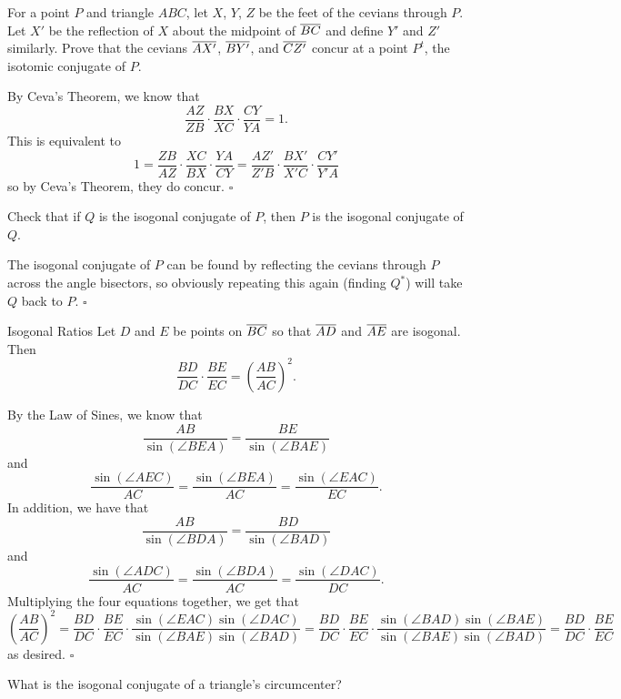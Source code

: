 \documentclass{article}
\begin{document}
\begin{problem}[4.20]{}
For a point $P$ and triangle $ABC$, let $X$, $Y$, $Z$ be the feet of the cevians through $P$. Let $X'$ be the reflection of $X$ about the midpoint of $\overline{BC}$ and define $Y'$ and $Z'$ similarly. Prove that the cevians $\overline{AX'}$, $\overline{BY'}$, and $\overline{CZ'}$ concur at a point $P^t$, the isotomic conjugate of $P$.
\end{problem}

By Ceva's Theorem, we know that \[\dfrac{AZ}{ZB}\cdot\dfrac{BX}{XC}\cdot\dfrac{CY}{YA} = 1.\] This is equivalent to \[1 = \dfrac{ZB}{AZ}\cdot\dfrac{XC}{BX}\cdot\dfrac{YA}{CY} = \dfrac{AZ'}{Z'B}\cdot\dfrac{BX'}{X'C}\cdot\dfrac{CY'}{Y'A}\] so by Ceva's Theorem, they do concur. $\square$

\begin{problem}[4.21]{}
Check that if $Q$ is the isogonal conjugate of $P$, then $P$ is the isogonal conjugate of $Q$.
\end{problem}

The isogonal conjugate of $P$ can be found by reflecting the cevians through $P$ across the angle bisectors, so obviously repeating this again (finding $Q^*$) will take $Q$ back to $P$. $\square$

\begin{problem}[4.22]{Isogonal Ratios}
Let $D$ and $E$ be points on $\overline{BC}$ so that $\overline{AD}$ and $\overline{AE}$ are isogonal. Then \[\dfrac{BD}{DC}\cdot\dfrac{BE}{EC} = \left(\dfrac{AB}{AC}\right)^2.\]
\end{problem}

By the Law of Sines, we know that \[\dfrac{AB}{\sin(\angle BEA)} = \dfrac{BE}{\sin(\angle BAE)}\] and \[\dfrac{\sin(\angle AEC)}{AC} = \dfrac{\sin(\angle BEA)}{AC} = \dfrac{\sin(\angle EAC)}{EC}.\] In addition, we have that \[\dfrac{AB}{\sin(\angle BDA)} = \dfrac{BD}{\sin(\angle BAD)}\] and \[\dfrac{\sin(\angle ADC)}{AC} = \dfrac{\sin(\angle BDA)}{AC} = \dfrac{\sin(\angle DAC)}{DC}.\] Multiplying the four equations together, we get that \[\left(\dfrac{AB}{AC}\right)^2 = \dfrac{BD}{DC}\cdot\dfrac{BE}{EC}\cdot\dfrac{\sin(\angle EAC)\sin(\angle DAC)}{\sin(\angle BAE)\sin(\angle BAD)} = \dfrac{BD}{DC}\cdot\dfrac{BE}{EC}\cdot\dfrac{\sin(\angle BAD)\sin(\angle BAE)}{\sin(\angle BAE)\sin(\angle BAD)} = \dfrac{BD}{DC}\cdot\dfrac{BE}{EC}\] as desired. $\square$

\begin{problem}[4.23]{}
What is the isogonal conjugate of a triangle’s circumcenter?
\end{problem}
\end{document}
